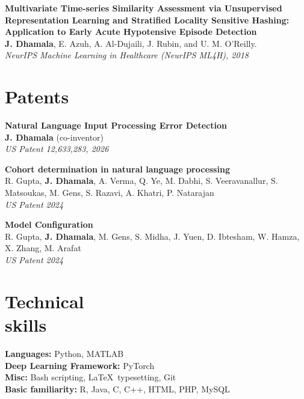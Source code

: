 \documentclass[margin]{res}
\begin{document}
\begin{resume}
\textbf{Multivariate Time-series Similarity Assessment via Unsupervised Representation Learning and Stratified Locality Sensitive Hashing: Application to Early Acute Hypotensive Episode Detection}\\
\textbf{J. Dhamala}, E. Azuh, A. Al-Dujaili, J. Rubin, and U. M. O'Reilly.\\
{\sl NeurIPS Machine Learning in Healthcare (NeurIPS ML4H), 2018}

\section{Patents}
\textbf{Natural Language Input Processing Error Detection}\\
\small{\textbf{J. Dhamala} (co-inventor)}\\
{\sl US Patent 12,633,283, 2026}

\textbf{Cohort determination in natural language processing}\\
\small{{R. Gupta, \textbf{J. Dhamala}, A. Verma, Q. Ye, M. Dabhi, S. Veeravanallur, S. Matsoukas, M. Gens, S. Razavi, A. Khatri, P. Natarajan}}\\
{\sl US Patent 2024}

\textbf{Model Configuration}\\
\small{{R. Gupta, \textbf{J. Dhamala}, M. Gens, S. Midha, J. Yuen, D. Ibtesham, W. Hamza, X. Zhang, M. Arafat}}\\
{\sl US Patent 2024}

\section{Technical\\skills}

\textbf{Languages: } Python, MATLAB
\\
\textbf{Deep Learning Framework: } PyTorch
\\
\textbf{Misc: } Bash scripting, \LaTeX\ typesetting, Git
\\
\textbf{Basic familiarity: } R, Java, C, C++, HTML, PHP, MySQL


\end{resume}
\end{document}
